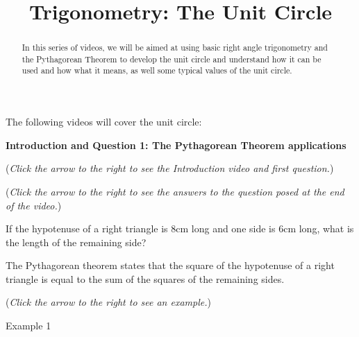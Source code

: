 \documentclass{ximera}
\title[Prerequisite Videos: ]{Trigonometry: The Unit Circle}
\begin{document}
\begin{abstract}
  In this series of videos, we will be aimed at using basic right angle
  trigonometry and the Pythagorean Theorem to develop the unit circle 
  and understand how it can be used and how what it means, 
  as well some typical values of the unit circle.
\end{abstract}
\maketitle

The following videos will cover the unit circle:

\textbf{Introduction and Question 1: The Pythagorean Theorem applications}
\begin{question}
\begin{flushright}
{\color{blue}(\emph{Click the arrow to the right to see the Introduction video and first question.})}
\end{flushright}
\begin{center}
\begin{expandable}
{\color{blue}(\emph{Click the arrow to the right to see the answers 
to the question posed at the end of the video.})}
\begin{expandable}
If the hypotenuse of a right triangle is $8$cm long and one side is
$6$cm long, what is the length of the remaining side?
\begin{multipleChoice}
\end{multipleChoice}
\begin{hint}
The Pythagorean theorem states that the square of the hypotenuse
of a right triangle is equal to the sum of the squares of the remaining
sides.
\end{hint}
\begin{flushright}
{\color{blue}(\emph{Click the arrow to the right to see an example.})}
\end{flushright}
\begin{expandable}
Example 1
\end{expandable}
\end{expandable}
\end{expandable}
\end{center}
\end{question}
\end{document}
